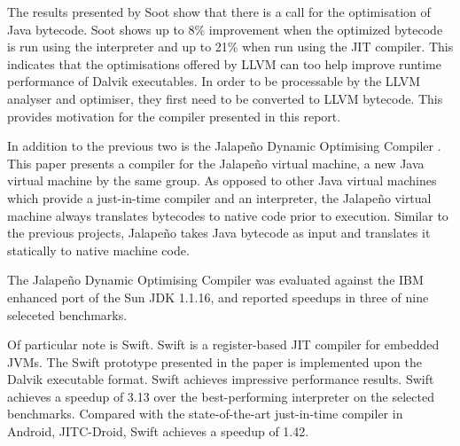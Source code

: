 The results presented by Soot show that there is a call for the optimisation of Java bytecode. Soot shows up to 8\% improvement when the optimized bytecode is run using the interpreter and up to 21\% when run using the JIT compiler. This indicates that the optimisations offered by LLVM can too help improve runtime performance of Dalvik executables. In order to be processable by the LLVM analyser and optimiser, they first need to be converted to LLVM bytecode. This provides motivation for the compiler presented in this report.


In addition to the previous two is the Jalape\~{n}o Dynamic Optimising Compiler \cite{Burke:1999:JDO:304065.304113}. This paper presents a compiler for the Jalape\~{n}o virtual machine, a new Java virtual machine by the same group. As opposed to other Java virtual machines which provide a just-in-time compiler and an interpreter, the Jalape\~{n}o virtual machine always translates bytecodes to native code prior to execution. Similar to the previous projects, Jalape\~{n}o takes Java bytecode as input and translates it statically to native machine code.

The Jalape\~{n}o Dynamic Optimising Compiler was evaluated against the IBM enhanced port of the Sun JDK 1.1.16, and reported speedups in three of nine seleceted benchmarks.


Of particular note is Swift\cite{Zhang:2012:SRJ:2151024.2151035}. Swift is a register-based JIT compiler for embedded JVMs. The Swift prototype presented in the paper is implemented upon the Dalvik executable format. Swift achieves impressive performance results. Swift achieves a speedup of 3.13 over the best-performing interpreter on the selected benchmarks. Compared with the state-of-the-art just-in-time compiler in Android, JITC-Droid, Swift achieves a speedup of 1.42.
